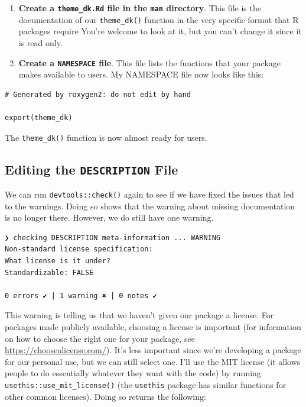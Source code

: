 \documentclass[
]{book}
\begin{document}
\begin{enumerate}
\def\labelenumi{\arabic{enumi}.}
\item
  \textbf{Create a \texttt{theme\_dk.Rd} file in the \texttt{man} directory}. This file is the documentation of our \texttt{theme\_dk()} function in the very specific format that R packages require You're welcome to look at it, but you can't change it since it is read only.
\item
  \textbf{Create a \texttt{NAMESPACE} file}. This file lists the functions that your package makes available to users. My NAMESPACE file now looks like this:
\end{enumerate}

\begin{verbatim}
# Generated by roxygen2: do not edit by hand

export(theme_dk)
\end{verbatim}

The \texttt{theme\_dk()} function is now almost ready for users.

\hypertarget{editing-the-description-file}{%
\subsection*{\texorpdfstring{Editing the \texttt{DESCRIPTION} File}{Editing the DESCRIPTION File}}\label{editing-the-description-file}}

We can run \texttt{devtools::check()} again to see if we have fixed the issues that led to the warnings. Doing so shows that the warning about missing documentation is no longer there. However, we do still have one warning.

\begin{verbatim}
❯ checking DESCRIPTION meta-information ... WARNING
Non-standard license specification:
What license is it under?
Standardizable: FALSE

0 errors ✔ | 1 warning ✖ | 0 notes ✔
\end{verbatim}

This warning is telling us that we haven't given our package a license. For packages made publicly available, choosing a license is important (for information on how to choose the right one for your package, see \url{https://choosealicense.com/}). It's less important since we're developing a package for our personal use, but we can still select one. I'll use the MIT license (it allows people to do essentially whatever they want with the code) by running \texttt{usethis::use\_mit\_license()} (the \texttt{usethis} package has similar functions for other common licenses). Doing so returns the following:
\end{document}
